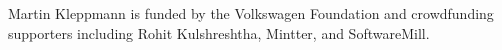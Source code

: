 \documentclass[sigconf,nonacm]{acmart}
\begin{document}



\begin{acks}
    Martin Kleppmann is funded by the Volkswagen Foundation and crowdfunding supporters including Rohit Kulshreshtha, Mintter, and SoftwareMill.
\end{acks}



\end{document}

